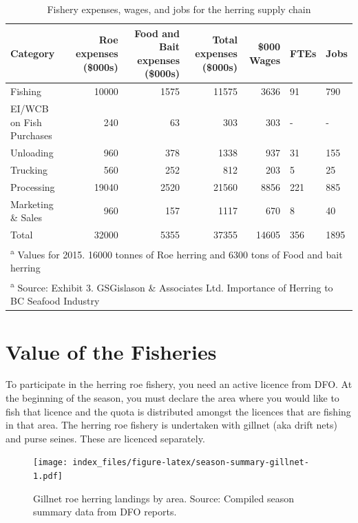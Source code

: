 \documentclass[]{article}
\theoremstyle{definition}
\theoremstyle{definition}
\theoremstyle{definition}
\theoremstyle{remark}
\begin{document}
\begin{table}

\caption{\label{tab:supply-chain-table}Fishery expenses, wages, and jobs for the herring supply chain}
\centering
\begin{tabular}[t]{l|r|r|r|r|l|l}
\hline
Category & Roe expenses (\$000s) & Food and Bait expenses (\$000s) & Total expenses (\$000s) & \$000 Wages & FTEs & Jobs\\
\hline
Fishing & 10000 & 1575 & 11575 & 3636 & 91 & 790\\
\hline
EI/WCB on Fish Purchases & 240 & 63 & 303 & 303 & - & -\\
\hline
Unloading & 960 & 378 & 1338 & 937 & 31 & 155\\
\hline
Trucking & 560 & 252 & 812 & 203 & 5 & 25\\
\hline
Processing & 19040 & 2520 & 21560 & 8856 & 221 & 885\\
\hline
Marketing \& Sales & 960 & 157 & 1117 & 670 & 8 & 40\\
\hline
Total & 32000 & 5355 & 37355 & 14605 & 356 & 1895\\
\hline
\multicolumn{7}{l}{\textsuperscript{a} Values for 2015. 16000 tonnes of Roe herring and 6300 tons of Food and bait herring}\\
\multicolumn{7}{l}{\textsuperscript{a} Source: Exhibit 3. GSGislason \& Associates Ltd. Importance of Herring to BC Seafood Industry}\\
\end{tabular}
\end{table}

\section{Value of the Fisheries}\label{value-of-the-fisheries}

To participate in the herring roe fishery, you need an active licence
from DFO. At the beginning of the season, you must declare the area
where you would like to fish that licence and the quota is distributed
amongst the licences that are fishing in that area. The herring roe
fishery is undertaken with gillnet (aka drift nets) and purse seines.
These are licenced separately.

\begin{figure}
\centering
\texttt{[image: index\_files/figure-latex/season-summary-gillnet-1.pdf]}
\caption{\label{fig:season-summary-gillnet}Gillnet roe herring landings by
area. Source: Compiled season summary data from DFO reports.}
\end{figure}
\end{document}
